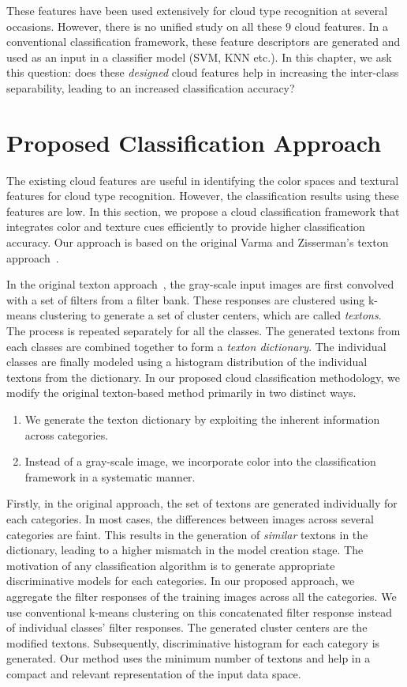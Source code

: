 These features have been used extensively for cloud type recognition at several occasions. However, there is no unified study on all these $9$ cloud features. In a conventional classification framework, these feature descriptors are generated and used as an input in a classifier model (SVM, KNN etc.). In this chapter, we ask this question: does these \emph{designed} cloud features help in increasing the inter-class separability, leading to an increased classification accuracy?


\section{Proposed Classification Approach}
\label{sec:chap6-proposed}
The existing cloud features are useful in identifying the color spaces and textural features for cloud type recognition. However, the classification results using these features are low. In this section, we propose a cloud classification framework that integrates color and texture cues efficiently to provide higher classification accuracy. Our approach is based on the original Varma and Zisserman's texton approach~\cite{varma_ziss2005}.

In the original texton approach~\cite{varma_ziss2005}, the gray-scale input images are first convolved with a set of filters from a filter bank. These responses are clustered using k-means clustering to generate a set of cluster centers, which are called \emph{textons}. The process is repeated separately for all the classes. The generated textons from each classes are combined together to form a \emph{texton dictionary}. The individual classes are finally modeled using a histogram distribution of the individual textons from the dictionary. In our proposed cloud  classification methodology, we modify the original texton-based method primarily in two distinct ways. 

\begin{enumerate}
\item We generate the texton dictionary by exploiting the inherent information across categories. 
\item Instead of a gray-scale image, we incorporate color into the classification framework in a systematic manner.
\end{enumerate}

Firstly, in the original approach, the set of textons are generated individually for each categories. In most cases, the differences between images across several categories are faint. This results in the generation of \emph{similar} textons in the dictionary, leading to a higher mismatch in the model creation stage. The motivation of any classification algorithm is to generate appropriate discriminative models for each categories. In our proposed approach, we aggregate the filter responses of the training images across all the categories. We use conventional k-means clustering on this concatenated filter response instead of individual classes' filter responses. The generated cluster centers are the modified textons. Subsequently, discriminative histogram for each category is generated. Our method uses the minimum number of textons and help in a compact and relevant representation of the input data space.

